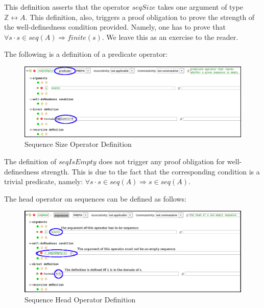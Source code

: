 This definition asserts that the operator $seqSize$ takes one argument of type $\mathbb{Z} \leftrightarrow A$.
This definition, also, triggers a proof obligation to prove the strength of the well-definedness condition provided. Namely, one has to prove that $\forall s \cdot s \in seq(A) \Longrightarrow finite(s)$. We leave this as an exercise to the reader.

\par 
The following is a definition of a predicate operator:

\begin{center}
\begin{figure}
\label{seqOP}
\includegraphics{images/SeqIsEmpty.png}
\caption{Sequence Size Operator Definition}
\end{figure}
\end{center}

The definition of $seqIsEmpty$ does not trigger any proof obligation for well-definedness strength. This is due to the fact that the corresponding condition is a trivial predicate, namely:
$\forall s \cdot s \in seq(A) \Longrightarrow s \in seq(A)$.

\par 
The head operator on sequences can be defined as follows:

\begin{center}
\begin{figure}
\label{seqOP}
\includegraphics{images/SeqHead.png}
\caption{Sequence Head Operator Definition}
\end{figure}
\end{center}

